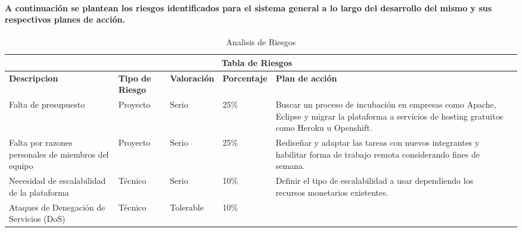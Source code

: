     \paragraph{A continuación se plantean los riesgos identificados para el sistema general a lo largo del desarrollo del mismo y sus respectivos planes de acción.}
    \newpage
    \begin{table}[b!]
    \centering
      \begin{tabular}{|p{3cm}|lllll}
        \hline
        \multicolumn{5}{|c|}{{\bf Tabla de Riesgos}} \\ 
        \hline
          \multicolumn{1}{|p{3cm}|}{{\bf Descripcion}} & 
          \multicolumn{1}{p{2cm}|}{{\bf Tipo de Riesgo}} & 
          \multicolumn{1}{p{2cm}|}{{\bf Valoración}} & 
          \multicolumn{1}{p{2cm}|}{{\bf Porcentaje}} & 
          \multicolumn{1}{p{5cm}|}{{\bf Plan de acción}} \\ 
        \hline
          \multicolumn{1}{|p{3cm}|}{Falta de presupuesto} & 
          \multicolumn{1}{p{2cm}|}{Proyecto} & 
          \multicolumn{1}{p{2cm}|}{Serio} & 
          \multicolumn{1}{p{2cm}|}{25\%} & 
          \multicolumn{1}{p{5cm}|}{Buscar un proceso de incubación en empresas como Apache, Eclipse y migrar la plataforma a servicios de hosting gratuitos como Heroku u Openshift.} \\ 
        \hline
          \multicolumn{1}{|p{3cm}|}{Falta por razones personales de miembros del equipo} & 
          \multicolumn{1}{p{2cm}|}{Proyecto} &
          \multicolumn{1}{p{2cm}|}{Serio} & 
          \multicolumn{1}{p{2cm}|}{25\%} & 
          \multicolumn{1}{p{5cm}|}{Rediseñar y adaptar las tareas con nuevos integrantes y habilitar forma de trabajo remota considerando fines de semana.} \\ 
        \hline
          \multicolumn{1}{|p{3cm}|}{Necesidad de escalabilidad de la plataforma} & 
          \multicolumn{1}{p{2cm}|}{Técnico} & 
          \multicolumn{1}{p{2cm}|}{Serio} & 
          \multicolumn{1}{p{2cm}|}{10\%} & 
          \multicolumn{1}{p{5cm}|}{Definir el tipo de escalabilidad a usar dependiendo los recursos monetarios existentes.} \\ 
        \hline
          \multicolumn{1}{|p{3cm}|}{Ataques de Denegación de Servicios (DoS)} & 
          \multicolumn{1}{p{2cm}|}{Técnico} & 
          \multicolumn{1}{p{2cm}|}{Tolerable} & 
          \multicolumn{1}{p{2cm}|}{10\%} & 
          \multicolumn{1}{p{5cm}|}{} \\ 
        \hline
      \end{tabular}
      \caption{Analisis de Riesgos}
      \label{Analisis de riesgos}
    \end{table}
    \clearpage
